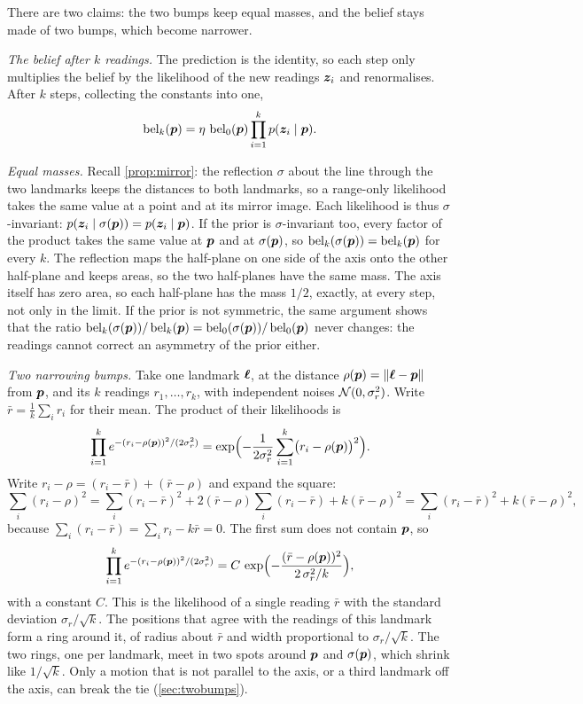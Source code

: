  There are two claims: the two bumps keep equal masses, and
the belief stays made of two bumps, which become narrower.

\emph{The belief after $k$ readings.} The prediction is the identity, so
each step only multiplies the belief by the likelihood of the new
readings $\bm{z}_i$ and renormalises. After $k$ steps, collecting the
constants into one,
\[
  \operatorname{bel}_k(\bm{p})=\eta\,\operatorname{bel}_0(\bm{p})\prod_{i=1}^kp(\bm{z}_i\mid\bm{p}).
\]

\emph{Equal masses.} Recall \cref{prop:mirror}: the reflection $\sigma$
about the line through the two landmarks keeps the distances to both
landmarks, so a range-only likelihood takes the same value at a point and
at its mirror image. Each likelihood is thus $\sigma$-invariant:
$p(\bm{z}_i\mid\sigma(\bm{p}))=p(\bm{z}_i\mid\bm{p})$. If the prior is
$\sigma$-invariant too, every factor of the product takes the same value
at $\bm{p}$ and at $\sigma(\bm{p})$, so $\operatorname{bel}_k(\sigma(\bm{p}))=\operatorname{bel}_k(\bm{p})$ for every
$k$. The reflection maps the half-plane on one side of the axis onto the
other half-plane and keeps areas, so the two half-planes have the same
mass. The axis itself has zero area, so each half-plane has the mass
$1/2$, exactly, at every step, not only in the limit. If the prior is not
symmetric, the same argument shows that the ratio
$\operatorname{bel}_k(\sigma(\bm{p}))/\operatorname{bel}_k(\bm{p})=\operatorname{bel}_0(\sigma(\bm{p}))/\operatorname{bel}_0(\bm{p})$ never
changes: the readings cannot correct an asymmetry of the prior either.

\emph{Two narrowing bumps.} Take one landmark $\bm{\ell}$, at the distance
$\rho(\bm{p})=\left\lVert \bm{\ell}-\bm{p}\right\rVert$ from $\bm{p}$, and its $k$ readings
$r_1,\dots,r_k$, with independent noises $\mathcal{N}(0,\sigma_r^2)$. Write
$\bar r=\frac1k\sum_ir_i$ for their mean. The product of their
likelihoods is
\[
  \prod_{i=1}^ke^{-(r_i-\rho(\bm{p}))^2/(2\sigma_r^2)}
  =\exp\Bigl(-\frac{1}{2\sigma_r^2}\sum_{i=1}^k\bigl(r_i-\rho(\bm{p})\bigr)^2\Bigr).
\]
Write $r_i-\rho=(r_i-\bar r)+(\bar r-\rho)$ and expand the square:
\[
  \sum_i(r_i-\rho)^2
  =\sum_i(r_i-\bar r)^2+2(\bar r-\rho)\sum_i(r_i-\bar r)+k(\bar r-\rho)^2
  =\sum_i(r_i-\bar r)^2+k(\bar r-\rho)^2 ,
\]
because $\sum_i(r_i-\bar r)=\sum_ir_i-k\bar r=0$. The first sum does not
contain $\bm{p}$, so
\[
  \prod_{i=1}^ke^{-(r_i-\rho(\bm{p}))^2/(2\sigma_r^2)}
  =C\,\exp\Bigl(-\frac{(\bar r-\rho(\bm{p}))^2}{2\,\sigma_r^2/k}\Bigr),
\]
with a constant $C$. This is the likelihood of a single reading $\bar r$
with the standard deviation $\sigma_r/\sqrt k$. The positions that agree
with the readings of this landmark form a ring around it, of radius about
$\bar r$ and width proportional to $\sigma_r/\sqrt k$. The two rings, one
per landmark, meet in two spots around $\bm{p}$ and $\sigma(\bm{p})$, which shrink
like $1/\sqrt k$. Only a motion that is not parallel to the axis, or a
third landmark off the axis, can break the tie (\cref{sec:twobumps}).

